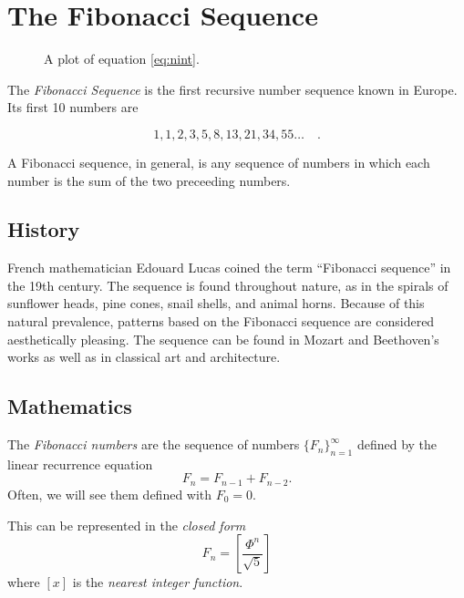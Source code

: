 

\section{The Fibonacci Sequence}

\begin{figure}[h]
  \begin{center}
    
  \end{center}
  \caption{A plot of equation \ref{eq:nint}.}
\end{figure}
The \emph{Fibonacci Sequence} is the first recursive number sequence known in Europe. Its first 10 numbers are

\[ 1, 1, 2, 3, 5, 8, 13, 21, 34, 55\dots \quad \text{.} \]

A Fibonacci sequence, in general, is any sequence of numbers in which each number is the sum of the two preceeding numbers.\cite{britannica12}


\subsection{History}

French mathematician Edouard Lucas coined the term ``Fibonacci sequence'' in the 19th century.
The sequence is found throughout nature, as in the spirals of sunflower heads, pine cones, snail shells, and animal horns.\cite{britannica12}
Because of this natural prevalence, patterns based on the Fibonacci sequence are considered aesthetically pleasing.
The sequence can be found in Mozart and Beethoven's works as well as in classical art and architecture. \cite[p.~94]{design10}


\subsection{Mathematics}

\begin{defn}The \emph{Fibonacci numbers} are the sequence of numbers \(\{F_n\}^\infty_{n=1}\) defined by the linear recurrence equation
\begin{equation}
  F_n=F_{n-1}+F_{n-2} \text{.}
\end{equation}
Often, we will see them defined with \(F_0=0\).
\end{defn}

This can be represented in the \emph{closed form}
\begin{equation}
  F_n=\left[ \frac{\Phi^n}{\sqrt{5}}\right]
  \label{eq:nint}
\end{equation}
where \([x]\) is the \emph{nearest integer function}. \cite{mwfib}


